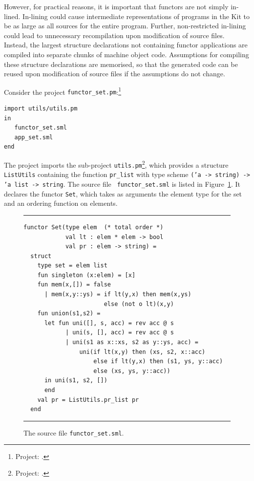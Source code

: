 \documentclass[12pt]{book}
\begin{document}
However, for practical reasons, it is important that functors are not
simply in-lined. In-lining could cause intermediate representations of
programs in the Kit to be as large as all sources for the entire
program.  Further, non-restricted in-lining could lead to unnecessary
recompilation upon modification of source files. Instead, the largest
structure declarations not containing functor applications are
compiled into separate chunks of machine object code. Assumptions for
compiling these structure declarations are memorised, so that the
generated code can be reused upon modification of source files if the
assumptions do not change.

Consider the project {\tt functor\_set.pm}:\footnote{Project:
  .}
\begin{verbatim}
import utils/utils.pm
in
   functor_set.sml
   app_set.sml
end
\end{verbatim}
The project imports the sub-project {\tt utils.pm}\footnote{Project:
.}, which provides a structure {\tt
ListUtils} containing the function {\tt pr\_list} with type scheme
{\tt ('a -> string) -> 'a list -> string}. The source file {\tt
functor\_set.sml} is listed in Figure~\ref{functor_set.fig}. It
declares the functor {\tt Set}, which takes as arguments the element
type for the set and an ordering function on elements.
\begin{figure}
\hrule \medskip
\begin{verbatim}
functor Set(type elem  (* total order *)
            val lt : elem * elem -> bool
            val pr : elem -> string) =
  struct
    type set = elem list
    fun singleton (x:elem) = [x]
    fun mem(x,[]) = false
      | mem(x,y::ys) = if lt(y,x) then mem(x,ys)
                       else (not o lt)(x,y)
    fun union(s1,s2) = 
      let fun uni([], s, acc) = rev acc @ s
            | uni(s, [], acc) = rev acc @ s
            | uni(s1 as x::xs, s2 as y::ys, acc) = 
                uni(if lt(x,y) then (xs, s2, x::acc)
                    else if lt(y,x) then (s1, ys, y::acc)
                    else (xs, ys, y::acc))
      in uni(s1, s2, []) 
      end
    val pr = ListUtils.pr_list pr
  end
\end{verbatim}
\caption{\label{functor_set.fig} The source file {\tt functor\_set.sml}.}
\medskip \hrule
\end{figure}
\end{document}
